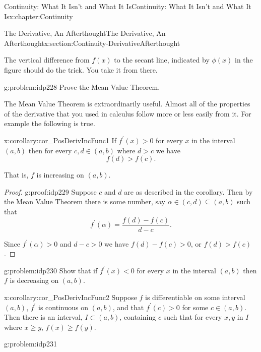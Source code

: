 \begin{chapterptx}{Continuity: What It Isn't and What It Is}{}{Continuity: What It Isn't and What It Is}{}{}{x:chapter:Continuity}
\begin{sectionptx}{The Derivative, An Afterthought}{}{The Derivative, An Afterthought}{}{}{x:section:Continuity-DerivativeAfterthought}
\begin{image}{0.22}{0.56}{0.22}
		\end{image}%
		The vertical difference from \(f(x)\) to the secant line, indicated by \(\phi(x)\) in the figure should do the trick. You take it from there.%
		\begin{problem}{}{g:problem:idp228}%
			 Prove the Mean Value Theorem.%
		\end{problem}
		The Mean Value Theorem is extraordinarily useful. Almost all of the properties of the derivative that you used in calculus follow more or less easily from it. For example the following is true.%
		\begin{corollary}{}{}{x:corollary:cor_PosDerivIncFunc1}%
			If \(f^\prime(x) > 0\) for every \(x\) in the interval \((a,b)\) then for every \(c,d\in(a,b)\) where \(d>c\) we have%
			\begin{equation*}
				f(d) > f(c) \text{.}
			\end{equation*}
			\par
			That is, \(f\) is increasing on \((a,b)\).%
		\end{corollary}
		\begin{proof}{}{g:proof:idp229}
			Suppose \(c\) and \(d\) are as described in the corollary. Then by the Mean Value Theorem there is some number, say \(\alpha\in(c,d)\subseteq(a,b)\) such that%
			\begin{equation*}
				f^\prime(\alpha)=\frac{f(d)-f(c)}{d-c}\text{.}
			\end{equation*}
			\par
			Since \(f^\prime(\alpha)>0\) and \(d-c>0\) we have \(f(d)-f(c)>0\), or \(f(d)>f(c)\).%
		\end{proof}
		\begin{problem}{}{g:problem:idp230}%
			 Show that if \(f^\prime(x) \lt 0\) for every \(x\) in the interval \((a,b)\) then \(f\) is decreasing on \((a,b)\).%
		\end{problem}
		\begin{corollary}{}{}{x:corollary:cor_PosDerivIncFunc2}%
			Suppose \(f\) is differentiable on some interval \((a,b)\), \(f^\prime\) is continuous on \((a,b)\), and that \(f^\prime(c)>0\) for some \(c\in (a,b)\). Then there is an interval, \(I\subset (a,b)\), containing \(c\) such that for every \(x,
			y\) in \(I\) where \(x\ge y\), \(f(x)\ge f(y)\).%
		\end{corollary}
		\begin{problem}{}{g:problem:idp231}%

\end{problem}
\end{sectionptx}
\end{chapterptx}
